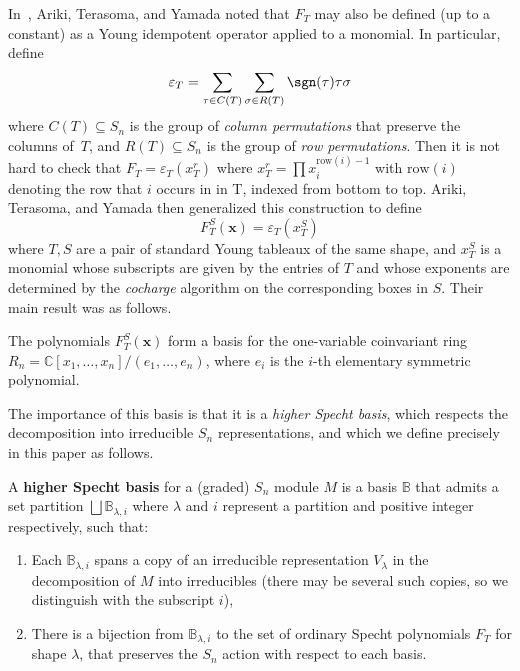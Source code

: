 In~\cite{ATY}, Ariki, Terasoma, and Yamada noted that $F_T$ may also be defined (up to a constant) as a Young idempotent operator applied to a monomial.  In particular, define $$\varepsilon_T=\sum_{\tau \in C(T)}\sum_{\sigma \in R(T)}\sgn(\tau) \tau \sigma$$ where $C(T)\subseteq S_n$ is the group of \textit{column permutations} that preserve the columns of~$T$, and $R(T)\subseteq S_n$ is the group of \textit{row permutations}. 
Then it is not hard to check that $F_T=\varepsilon_T(x_T^r)$ where $x_T^r=\prod x_i^{\mathrm{row}(i)-1}$ with $\mathrm{row}(i)$ denoting the row that $i$ occurs in in T, indexed from bottom to top.  Ariki, Terasoma, and Yamada then generalized this construction to define 
\begin{equation}\label{eq:ATY} F_T^S(\mathbf{x}) = \varepsilon_T(x_T^S)\end{equation} 
where $T,S$ are a pair of standard Young tableaux of the same shape, and $x_T^S$ is a monomial whose subscripts are given by the entries of $T$ and whose exponents are determined by the \textit{cocharge} algorithm on the corresponding boxes in $S$.  Their main result was as follows.

\begin{thm}
	The polynomials $F_T^S(\mathbf{x})$ form a basis for the one-variable coinvariant ring $R_n=\mathbb{C}[x_1,\ldots,x_n]/(e_1,\ldots,e_n)$, where $e_i$ is the $i$-th elementary symmetric polynomial.
\end{thm}

The importance of this basis is that it is a \textit{higher Specht basis}, which respects the decomposition into irreducible $S_n$ representations, and which we define precisely in this paper as follows.

\begin{definition}
	A \textbf{higher Specht basis} for a (graded) $S_n$ module $M$ is a basis $\mathbb{B}$ that admits a set partition $\bigsqcup \mathbb{B}_{\lambda,i}$ where $\lambda$ and $i$ represent a partition and positive integer respectively, such that:
	\begin{enumerate}
		\item Each $\mathbb{B}_{\lambda,i}$ spans a copy of an irreducible representation $V_\lambda$ in the decomposition of $M$ into irreducibles (there may be several such copies, so we distinguish with the subscript $i$),
		\item There is a bijection from $\mathbb{B}_{\lambda,i}$ to the set of ordinary Specht polynomials $F_T$ for shape $\lambda$, that preserves the $S_n$ action with respect to each basis.
	\end{enumerate} 
\end{definition}


